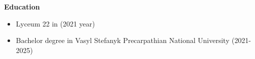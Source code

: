 {\vspace{1cm} \hspace{-1cm} \Large \textbf{Education}}

\begin{itemize}
    \item Lyceum 22 in (2021 year)
    \item Bachelor degree in Vasyl Stefanyk Precarpathian National University (2021-2025)
\end{itemize}